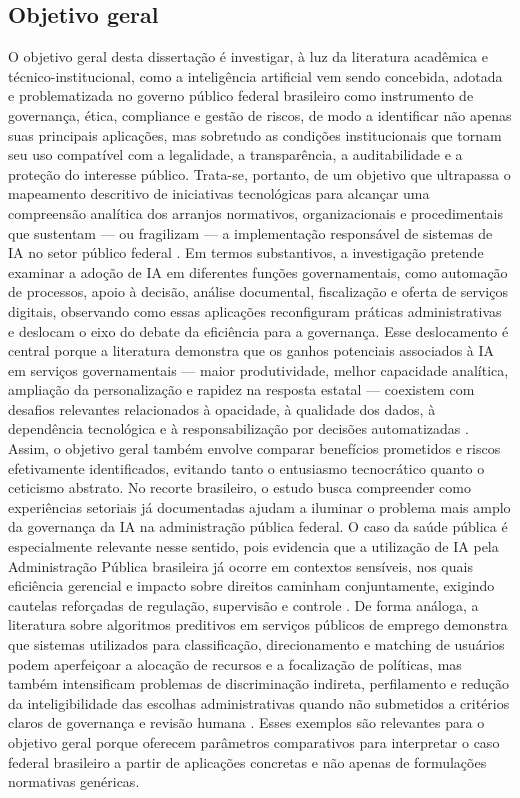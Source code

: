 \documentclass[12pt,a4paper]{article}
\begin{document}
\subsection{Objetivo geral}
\label{sec:org1944a0f}
O objetivo geral desta dissertação é investigar, à luz da literatura acadêmica e técnico-institucional, como a inteligência artificial vem sendo concebida, adotada e problematizada no governo público federal brasileiro como instrumento de governança, ética, compliance e gestão de riscos, de modo a identificar não apenas suas principais aplicações, mas sobretudo as condições institucionais que tornam seu uso compatível com a legalidade, a transparência, a auditabilidade e a proteção do interesse público. Trata-se, portanto, de um objetivo que ultrapassa o mapeamento descritivo de iniciativas tecnológicas para alcançar uma compreensão analítica dos arranjos normativos, organizacionais e procedimentais que sustentam — ou fragilizam — a implementação responsável de sistemas de IA no setor público federal \autocite{pi2021machine} \autocite{madan2022ai} \autocite{criado2024artificial}.
Em termos substantivos, a investigação pretende examinar a adoção de IA em diferentes funções governamentais, como automação de processos, apoio à decisão, análise documental, fiscalização e oferta de serviços digitais, observando como essas aplicações reconfiguram práticas administrativas e deslocam o eixo do debate da eficiência para a governança. Esse deslocamento é central porque a literatura demonstra que os ganhos potenciais associados à IA em serviços governamentais — maior produtividade, melhor capacidade analítica, ampliação da personalização e rapidez na resposta estatal — coexistem com desafios relevantes relacionados à opacidade, à qualidade dos dados, à dependência tecnológica e à responsabilização por decisões automatizadas \autocite{alhosani2024opportunities} \autocite{pi2021machine}. Assim, o objetivo geral também envolve comparar benefícios prometidos e riscos efetivamente identificados, evitando tanto o entusiasmo tecnocrático quanto o ceticismo abstrato.
No recorte brasileiro, o estudo busca compreender como experiências setoriais já documentadas ajudam a iluminar o problema mais amplo da governança da IA na administração pública federal. O caso da saúde pública é especialmente relevante nesse sentido, pois evidencia que a utilização de IA pela Administração Pública brasileira já ocorre em contextos sensíveis, nos quais eficiência gerencial e impacto sobre direitos caminham conjuntamente, exigindo cautelas reforçadas de regulação, supervisão e controle \autocite{lemes2020o}. De forma análoga, a literatura sobre algoritmos preditivos em serviços públicos de emprego demonstra que sistemas utilizados para classificação, direcionamento e matching de usuários podem aperfeiçoar a alocação de recursos e a focalização de políticas, mas também intensificam problemas de discriminação indireta, perfilamento e redução da inteligibilidade das escolhas administrativas quando não submetidos a critérios claros de governança e revisão humana \autocite{krtner2021predictive}. Esses exemplos são relevantes para o objetivo geral porque oferecem parâmetros comparativos para interpretar o caso federal brasileiro a partir de aplicações concretas e não apenas de formulações normativas genéricas.
\end{document}
